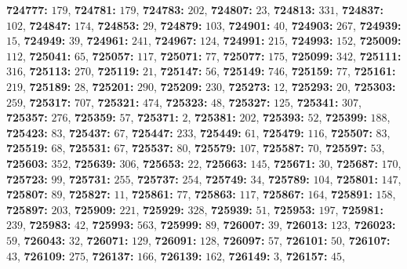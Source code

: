\textsf{\bfseries 724777:} $179$, \textsf{\bfseries 724781:} $179$, \textsf{\bfseries 724783:} $202$, \textsf{\bfseries 724807:} $23$, \textsf{\bfseries 724813:} $331$, \textsf{\bfseries 724837:} $102$, \textsf{\bfseries 724847:} $174$, \textsf{\bfseries 724853:} $29$, \textsf{\bfseries 724879:} $103$, \textsf{\bfseries 724901:} $40$, \textsf{\bfseries 724903:} $267$, \textsf{\bfseries 724939:} $15$, \textsf{\bfseries 724949:} $39$, \textsf{\bfseries 724961:} $241$, \textsf{\bfseries 724967:} $124$, \textsf{\bfseries 724991:} $215$, \textsf{\bfseries 724993:} $152$, \textsf{\bfseries 725009:} $112$, \textsf{\bfseries 725041:} $65$, \textsf{\bfseries 725057:} $117$, \textsf{\bfseries 725071:} $77$, \textsf{\bfseries 725077:} $175$, \textsf{\bfseries 725099:} $342$, \textsf{\bfseries 725111:} $316$, \textsf{\bfseries 725113:} $270$, \textsf{\bfseries 725119:} $21$, \textsf{\bfseries 725147:} $56$, \textsf{\bfseries 725149:} $746$, \textsf{\bfseries 725159:} $77$, \textsf{\bfseries 725161:} $219$, \textsf{\bfseries 725189:} $28$, \textsf{\bfseries 725201:} $290$, \textsf{\bfseries 725209:} $230$, \textsf{\bfseries 725273:} $12$, \textsf{\bfseries 725293:} $20$, \textsf{\bfseries 725303:} $259$, \textsf{\bfseries 725317:} $707$, \textsf{\bfseries 725321:} $474$, \textsf{\bfseries 725323:} $48$, \textsf{\bfseries 725327:} $125$, \textsf{\bfseries 725341:} $307$, \textsf{\bfseries 725357:} $276$, \textsf{\bfseries 725359:} $57$, \textsf{\bfseries 725371:} $2$, \textsf{\bfseries 725381:} $202$, \textsf{\bfseries 725393:} $52$, \textsf{\bfseries 725399:} $188$, \textsf{\bfseries 725423:} $83$, \textsf{\bfseries 725437:} $67$, \textsf{\bfseries 725447:} $233$, \textsf{\bfseries 725449:} $61$, \textsf{\bfseries 725479:} $116$, \textsf{\bfseries 725507:} $83$, \textsf{\bfseries 725519:} $68$, \textsf{\bfseries 725531:} $67$, \textsf{\bfseries 725537:} $80$, \textsf{\bfseries 725579:} $107$, \textsf{\bfseries 725587:} $70$, \textsf{\bfseries 725597:} $53$, \textsf{\bfseries 725603:} $352$, \textsf{\bfseries 725639:} $306$, \textsf{\bfseries 725653:} $22$, \textsf{\bfseries 725663:} $145$, \textsf{\bfseries 725671:} $30$, \textsf{\bfseries 725687:} $170$, \textsf{\bfseries 725723:} $99$, \textsf{\bfseries 725731:} $255$, \textsf{\bfseries 725737:} $254$, \textsf{\bfseries 725749:} $34$, \textsf{\bfseries 725789:} $104$, \textsf{\bfseries 725801:} $147$, \textsf{\bfseries 725807:} $89$, \textsf{\bfseries 725827:} $11$, \textsf{\bfseries 725861:} $77$, \textsf{\bfseries 725863:} $117$, \textsf{\bfseries 725867:} $164$, \textsf{\bfseries 725891:} $158$, \textsf{\bfseries 725897:} $203$, \textsf{\bfseries 725909:} $221$, \textsf{\bfseries 725929:} $328$, \textsf{\bfseries 725939:} $51$, \textsf{\bfseries 725953:} $197$, \textsf{\bfseries 725981:} $239$, \textsf{\bfseries 725983:} $42$, \textsf{\bfseries 725993:} $563$, \textsf{\bfseries 725999:} $89$, \textsf{\bfseries 726007:} $39$, \textsf{\bfseries 726013:} $123$, \textsf{\bfseries 726023:} $59$, \textsf{\bfseries 726043:} $32$, \textsf{\bfseries 726071:} $129$, \textsf{\bfseries 726091:} $128$, \textsf{\bfseries 726097:} $57$, \textsf{\bfseries 726101:} $50$, \textsf{\bfseries 726107:} $43$, \textsf{\bfseries 726109:} $275$, \textsf{\bfseries 726137:} $166$, \textsf{\bfseries 726139:} $162$, \textsf{\bfseries 726149:} $3$, \textsf{\bfseries 726157:} $45$, 
